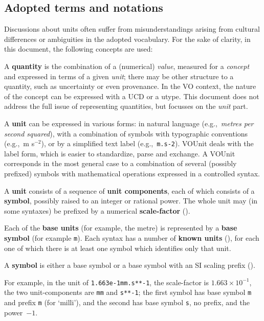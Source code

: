 \documentclass[11pt,a4paper]{ivoa}
\newcommand{\unit}[1]{\texttt{\small\color{orange}#1}}
\def\eg{e.g.,~}
\begin{document}
\subsection{Adopted terms and notations\label{sec:notations}}

Discussions about units often suffer from misunderstandings arising from cultural
differences or ambiguities in the adopted vocabulary. For the sake of clarity, in this
document, the following concepts are used:

A \textbf{quantity} is the combination of a (numerical) {\em
value}, measured for a {\em concept} and expressed in terms of a given
{\em unit}; there may be other structure to a quantity, such as
uncertainty or even provenance.
In the VO context, the nature of the concept can be expressed with a UCD or a utype. This document does not address the full issue of
representing quantities, but focusses on the {\em unit} part.

A \textbf{unit} can be expressed in various forms: in natural language
(\eg \emph{metres per second squared}), with a combination of symbols
with typographic conventions (\eg m s$^{-2}$), or by a simplified text
label (\eg \unit{m.s-2}). VOUnit deals with the label form, which is
easier to standardize, parse and exchange. A VOUnit corresponds in the
most general case to a combination of several (possibly prefixed)
symbols with mathematical operations expressed in a controlled syntax.

A \textbf{unit} consists of a sequence of \textbf{unit components},
each of which consists of a \textbf{symbol}, possibly raised
to an integer or rational power.  The whole unit may (in some
syntaxes) be prefixed by a numerical \textbf{scale-factor} ().

Each of the \textbf{base units} (for example, the metre) is
represented by a \textbf{base symbol} (for example \unit{m}).  Each
syntax has a number of \textbf{known units}
(), for each one of which there is at least
one symbol which identifies only that unit.

A \textbf{symbol} is either a base symbol or a base symbol with an SI
scaling prefix ().

For example, in the unit of \unit{1.663e-1mm.s**-1}, the scale-factor
is $1.663\times10^{-1}$, the two unit-components are \texttt{mm}
and \texttt{s**-1}; the first symbol has base symbol \texttt{m} and
prefix \texttt{m} (for `milli'), and the second has base
symbol \texttt{s}, no prefix, and the power~$-1$.
\end{document}
